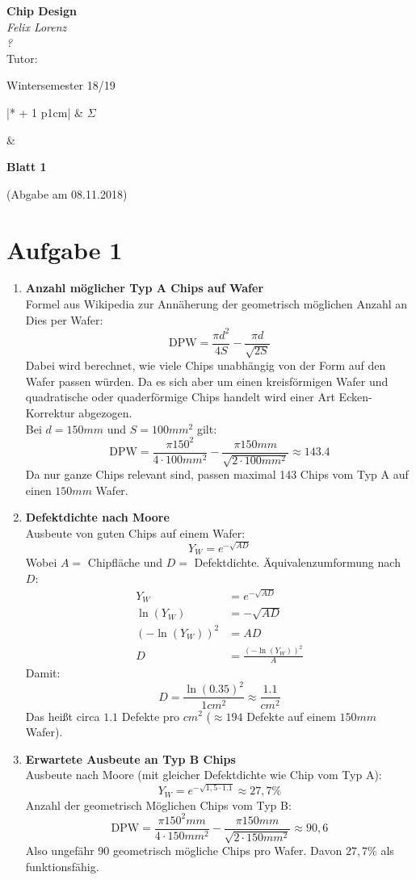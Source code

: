 \documentclass[a4paper,10pt,headsepline, DIV11]{scrartcl}%
\newcounter{aufgabe}
\def\tand{&}
\newcommand{\makeTableLine}[2][0]{%
	\setcounter{aufgabe}{1}%
	\whiledo{\value{aufgabe} < #1}%
	{%
		#2\tand\stepcounter{aufgabe}%
	}
}
\newcommand{\aufgTable}[1]{
	\def\spalten{\numexpr #1 + 1 \relax}
	\begin{tabular}{|*{\spalten}{p{1cm}|}}
		\makeTableLine[\spalten]{\theaufgabe}$\Sigma$~~\\ \hline
		\rule{0pt}{15pt}\makeTableLine[\spalten]{}\\
	\end{tabular}
}
\def\header#1#2#3#4#5#6#7#8{\pagestyle{empty}
	\begin{minipage}[t]{0.47\textwidth}
		\begin{flushleft}
			{\textbf{#4}}\\
			#5\\
			Tutor: #2\\
			#8
		\end{flushleft}
	\end{minipage}
	\begin{minipage}[t]{0.5\textwidth}
		\begin{flushright}
			#6 \vspace{0.5cm}\\
			\aufgTable{#7}
		\end{flushright}
	\end{minipage}
	\vspace{1cm}
	\begin{center}
		{\Large \textbf{Blatt #1}}
		
		{(Abgabe am #3)}
	\end{center}
}
\begin{document}
	\header{1}{}{08.11.2018}{Chip Design}{\textit{Felix Lorenz}\\ \textit{?}}{Wintersemester 18/19}{3}{}
	\vspace{1cm}
	\section*{Aufgabe 1}
	\begin{enumerate}
		\item \textbf{Anzahl möglicher Typ A Chips auf Wafer} \hfill \\
		Formel aus Wikipedia zur Annäherung der geometrisch möglichen Anzahl an Dies per Wafer:
		\[ \text{DPW} =  \frac{\pi d^2}{4S} - \frac{\pi d}{\sqrt{2S}}\]
		Dabei wird berechnet, wie viele Chips unabhängig von der Form auf den Wafer passen würden. Da es sich aber um einen kreisförmigen Wafer und quadratische oder quaderförmige Chips handelt wird einer Art Ecken-Korrektur abgezogen.\\
		Bei $d=150mm$ und $S = 100mm^2$ gilt:
		\[ \text{DPW} =  \frac{\pi 150^2}{4\cdot 100mm^2} - \frac{\pi 150mm}{\sqrt{2\cdot 100mm^2}} \approx 143.4\]
		Da nur ganze Chips relevant sind, passen maximal 143 Chips vom Typ A auf einen $150mm$ Wafer.
		\item  \textbf{Defektdichte nach Moore}\hfill \\
		Ausbeute von guten Chips auf einem Wafer:
		\[ Y_{W} = e^{-\sqrt{AD}} \]
		Wobei $A = $ Chipfläche und $D= $ Defektdichte. Äquivalenzumformung nach $D$:
		\begin{align*}
			Y_{W} &= e^{-\sqrt{AD}}\\
			\ln(Y_{W}) &= -\sqrt{AD}\\
			(-\ln(Y_{W}))^2 &= AD\\
			D &= \frac{(-\ln(Y_{W}))^2}{A}
		\end{align*}
		Damit:
		\[ D= \frac{\ln(0.35)^2}{1cm^2} \approx \frac{1.1}{cm^2}\]
		Das heißt circa $1.1$ Defekte pro $cm^2$ ($\approx 194$ Defekte auf einem $150mm$ Wafer).
		\item \textbf{Erwartete Ausbeute an Typ B Chips}\hfill\\
		Ausbeute nach Moore (mit gleicher Defektdichte wie Chip vom Typ A):
		\[ Y_{W} = e^{-\sqrt{1,5\cdot 1.1}} \approx 27,7\%\]
		Anzahl der geometrisch Möglichen Chips vom Typ B:
		\[ \text{DPW} =  \frac{\pi 150^2mm}{4\cdot150mm^2} - \frac{\pi 150mm}{\sqrt{2\cdot 150mm^2}} \approx 90,6\]
		Also ungefähr 90 geometrisch mögliche Chips pro Wafer. Davon $27,7\%$ als funktionsfähig.

\end{enumerate}
\end{document}
